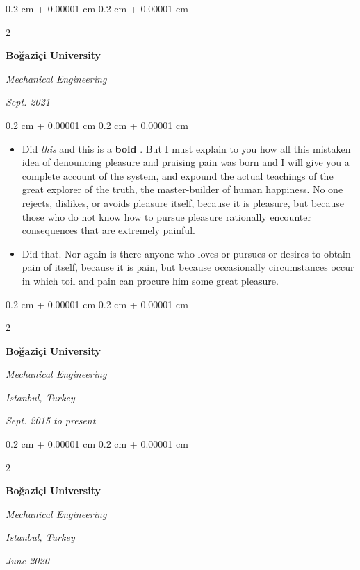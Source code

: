 \documentclass[10pt, letterpaper]{article}
\newenvironment{highlights}{
    \begin{itemize}[
        topsep=0.10 cm,
        parsep=0.10 cm,
        partopsep=0pt,
        itemsep=0pt,
        leftmargin=0.4 cm + 10pt
    ]
}{
    \end{itemize}
} %
\newenvironment{onecolentry}{
    \begin{adjustwidth}{
        0.2 cm + 0.00001 cm
    }{
        0.2 cm + 0.00001 cm
    }
}{
    \end{adjustwidth}
} %
\newenvironment{twocolentry}[2][]{
    \onecolentry
    \def\secondColumn{#2}
    \setcolumnwidth{\fill, 4.5 cm}
    \begin{paracol}{2}
}{
    \switchcolumn \raggedleft \secondColumn
    \end{paracol}
    \endonecolentry
} %
\let\hrefWithoutArrow\href
\renewcommand{\href}[2]{\hrefWithoutArrow{#1}{\mbox{\ifthenelse{\equal{#2}{}}{ }{#2 }\raisebox{.15ex}{\footnotesize \faExternalLink*}}}}
\begin{document}
        \vspace{0.2 cm-3px}

        \begin{twocolentry}{
            
            
        \textit{Sept. 2021}}
            \textbf{Boğaziçi University}

            \textit{Mechanical Engineering}
        \end{twocolentry}

        \vspace{0.10 cm-3px}
        \begin{onecolentry}
            \begin{highlights}
                \item Did \textit{this} and this is a \textbf{bold} \href{https://example.com}{link}. But I must explain to you how all this mistaken idea of denouncing pleasure and praising pain was born and I will give you a complete account of the system, and expound the actual teachings of the great explorer of the truth, the master-builder of human happiness. No one rejects, dislikes, or avoids pleasure itself, because it is pleasure, but because those who do not know how to pursue pleasure rationally encounter consequences that are extremely painful.
                \item Did that. Nor again is there anyone who loves or pursues or desires to obtain pain of itself, because it is pain, but because occasionally circumstances occur in which toil and pain can procure him some great pleasure.
            \end{highlights}
        \end{onecolentry}


        \vspace{0.2 cm-3px}

        \begin{twocolentry}{
        \textit{Istanbul, Turkey}    
            
        \textit{Sept. 2015 to present}}
            \textbf{Boğaziçi University}

            \textit{Mechanical Engineering}
        \end{twocolentry}



        \vspace{0.2 cm-3px}

        \begin{twocolentry}{
        \textit{Istanbul, Turkey}    
            
        \textit{June 2020}}
            \textbf{Boğaziçi University}

            \textit{Mechanical Engineering}
        \end{twocolentry}
\end{document}
